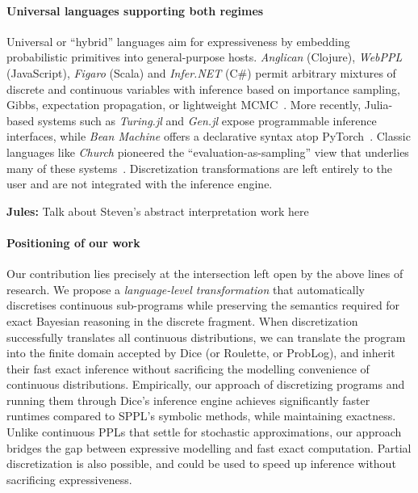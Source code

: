\documentclass[acmsmall,screen,dvipsnames,x11names,nonacm,anonymous,review]{acmart}
\newcommand{\jules}[1]{{\color{blue}\textbf{Jules:} #1}}
\begin{document}
\paragraph{Universal languages supporting both regimes}  
Universal or ``hybrid'' languages aim for expressiveness by embedding probabilistic primitives into general-purpose hosts. \emph{Anglican} (Clojure), \emph{WebPPL} (JavaScript), \emph{Figaro} (Scala) and \emph{Infer.NET} (C\#) permit arbitrary mixtures of discrete and continuous variables with inference based on importance sampling, Gibbs, expectation propagation, or lightweight MCMC~\cite{Tolpin2016Anglican,Goodman2014WebPPL,Pfeffer2009Figaro,Minka2018InferNET}. More recently, Julia-based systems such as \emph{Turing.jl} and \emph{Gen.jl} expose programmable inference interfaces, while \emph{Bean Machine} offers a declarative syntax atop PyTorch~\cite{Ge2018Turing,CusumanoTowner2019Gen,Tehrani2020BeanMachine}. Classic languages like \emph{Church} pioneered the ``evaluation-as-sampling'' view that underlies many of these systems~\cite{Goodman2008Church}. Discretization transformations are left entirely to the user and are not integrated with the inference engine.

\jules{Talk about Steven's abstract interpretation work here}

\paragraph{Positioning of our work}  
Our contribution lies precisely at the intersection left open by the above lines of research. We propose a \emph{language-level transformation} that automatically discretises continuous sub-programs while preserving the semantics required for exact Bayesian reasoning in the discrete fragment. When discretization successfully translates all continuous distributions, we can translate the program into the finite domain accepted by Dice (or Roulette, or ProbLog), and inherit their fast exact inference without sacrificing the modelling convenience of continuous distributions. 
Empirically, our approach of discretizing programs and running them through Dice's inference engine achieves significantly faster runtimes compared to SPPL's symbolic methods, while maintaining exactness. Unlike continuous PPLs that settle for stochastic approximations, our approach bridges the gap between expressive modelling and fast exact computation. Partial discretization is also possible, and could be used to speed up inference without sacrificing expressiveness.
\end{document}
